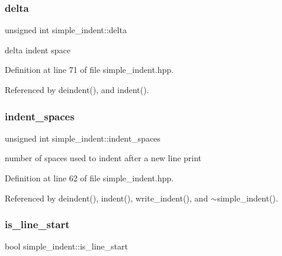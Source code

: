 \subsubsection{\texorpdfstring{delta}{delta}}
{\footnotesize\ttfamily unsigned int simple\+\_\+indent\+::delta\hspace{0.3cm}{\ttfamily [private]}}



delta indent space 



Definition at line 71 of file simple\+\_\+indent.\+hpp.



Referenced by deindent(), and indent().

\mbox{\label{classsimple__indent_accc69ae9d9ad959ae711a7cf9243d7d7}} 
\subsubsection{\texorpdfstring{indent\+\_\+spaces}{indent\_spaces}}
{\footnotesize\ttfamily unsigned int simple\+\_\+indent\+::indent\+\_\+spaces\hspace{0.3cm}{\ttfamily [private]}}



number of spaces used to indent after a new line print 



Definition at line 62 of file simple\+\_\+indent.\+hpp.



Referenced by deindent(), indent(), write\+\_\+indent(), and $\sim$simple\+\_\+indent().

\mbox{\label{classsimple__indent_a15aa364252fa38fff21e58f665176f80}} 
\subsubsection{\texorpdfstring{is\+\_\+line\+\_\+start}{is\_line\_start}}
{\footnotesize\ttfamily bool simple\+\_\+indent\+::is\+\_\+line\+\_\+start\hspace{0.3cm}{\ttfamily [private]}}



